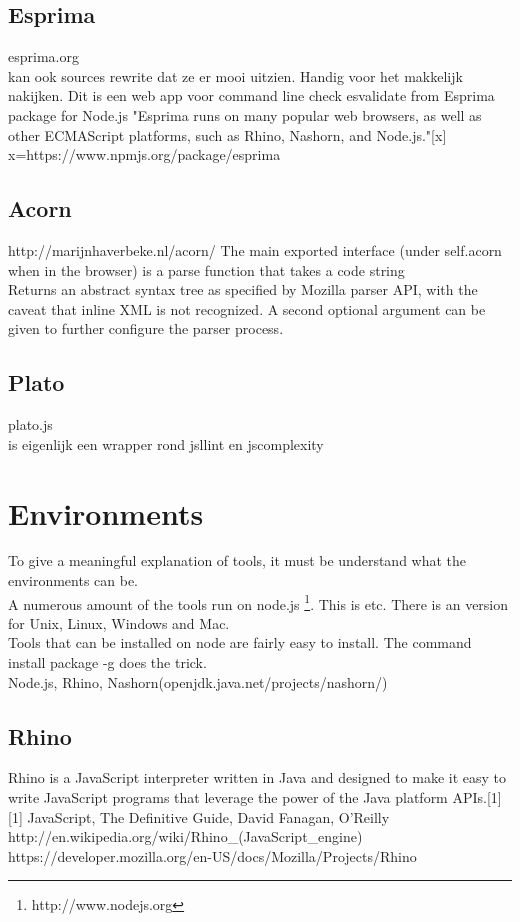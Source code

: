 \documentclass{article}
\begin{document}
\subsection{Esprima}
esprima.org\\
kan ook sources rewrite dat ze er mooi uitzien. Handig voor het makkelijk nakijken.
Dit is een web app
voor command line check esvalidate from Esprima package for Node.js
"Esprima runs on many popular web browsers, as well as other ECMAScript platforms, such as Rhino, Nashorn, and Node.js."[x]
x=https://www.npmjs.org/package/esprima

\subsection{Acorn}
http://marijnhaverbeke.nl/acorn/
The main exported interface (under self.acorn when in the browser) is a parse function that takes a code string\\
Returns an abstract syntax tree as specified by Mozilla parser API, with the caveat that inline XML is not recognized.
A second optional argument can be given to further configure the parser process.

\subsection{Plato}
plato.js\\
is eigenlijk een wrapper rond jsllint en jscomplexity


\section{Environments}
To give a meaningful explanation of tools, it must be understand what the environments can be.\\
A numerous amount of the tools run on node.js \footnote{http://www.nodejs.org}. This is etc.
There is an version for Unix, Linux, Windows and Mac.\\
Tools that can be installed on node are fairly easy to install. The command install package -g does the trick.\\
Node.js, Rhino, Nashorn(openjdk.java.net/projects/nashorn/)

\subsection{Rhino}Rhino is a JavaScript interpreter written in Java and designed to make it easy to write JavaScript programs that leverage the power of the Java platform APIs.[1]
[1] JavaScript, The Definitive Guide, David Fanagan, O'Reilly\newline
http://en.wikipedia.org/wiki/Rhino\_(JavaScript\_engine)
https://developer.mozilla.org/en-US/docs/Mozilla/Projects/Rhino
\end{document}
